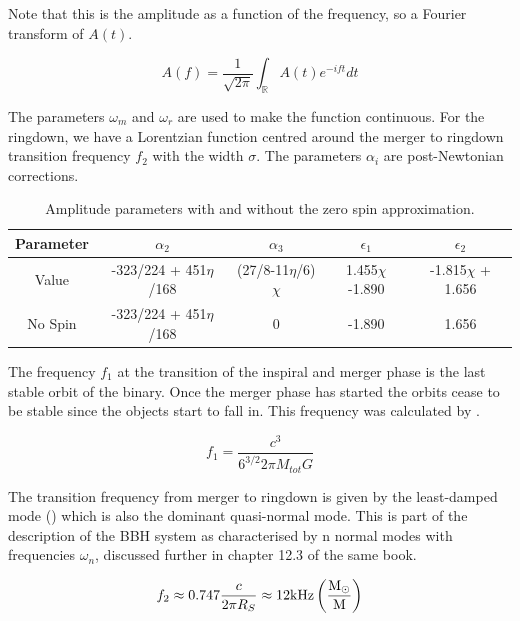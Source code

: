 Note that this is the amplitude as a function of the frequency, so a Fourier transform of $A(t)$.

\begin{equation}
    A(f) =  \frac{1}{\sqrt{2\pi}}\int_\mathbb{R} A(t) e^{-ift} dt
\end{equation}

The parameters $\omega_m$ and $\omega_r$ are used to make the function continuous. For the ringdown, we have a Lorentzian function centred around the merger to ringdown transition frequency $f_2$ with the width $\sigma$. The parameters $\alpha_i$ are post-Newtonian corrections.

\begin{table}[h]
    \begin{center}
        \begin{tabular}{ c | c | c | c | c}
            Parameter & $\alpha_2$ & $\alpha_3$ & $\epsilon_1$ & $\epsilon_2$ \\
            \hline
            Value & -323/224 + 451$\eta$/168 & (27/8-11$\eta$/6)$\chi$ & 1.455$\chi$-1.890 & -1.815$\chi$ + 1.656\\
            \hline
            No Spin & -323/224 +  451$\eta$/168 & 0 & -1.890 & 1.656 
        \end{tabular}
        \caption{Amplitude parameters with and without the zero spin approximation.}
        \label{amplitude_param}
    \end{center}
\end{table}

The frequency $f_1$ at the transition of the inspiral and merger phase is the last stable orbit of the binary. Once the merger phase has started the orbits cease to be stable since the objects start to fall in. This frequency was calculated by \cite{bardeen_rotating_1972}.

\begin{equation}
    f_1 = \frac{c^3}{6^{3/2}2\pi M_{tot} G}
\end{equation}

The transition frequency from merger to ringdown is given by the least-damped mode (\cite{maggiore_gravitational_2008}) which is also the dominant quasi-normal mode. This is part of the description of the BBH system as characterised by n normal modes with frequencies $\omega_n$, discussed further in chapter 12.3 of the same book.

\begin{equation}
    f_2 \approx 0.747 \frac{c}{2\pi R_S} \approx 12 \rm{kHz} \left( \frac{M_\odot}{M}\right)
\end{equation}


